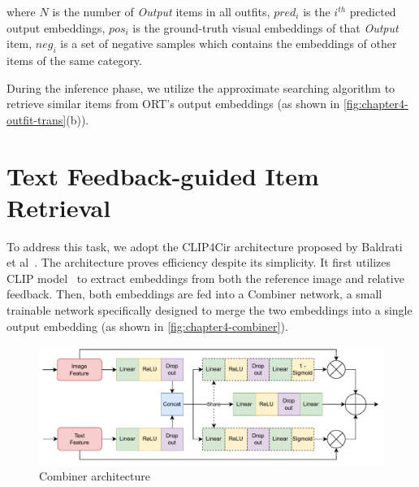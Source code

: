where $N$ is the number of \textit{Output} items in all outfits, $pred_i$ is the $i^{th}$ predicted output embeddings, $pos_i$ is the ground-truth visual embeddings of that \textit{Output} item, $neg_i$ is a set of negative samples which contains the embeddings of other items of the same category. 

During the inference phase, we utilize the approximate searching algorithm to retrieve similar items from ORT's output embeddings (as shown in \autoref{fig:chapter4-outfit-trans}(b)).

\section{Text Feedback-guided Item Retrieval}
To address this task, we adopt the CLIP4Cir architecture proposed by Baldrati et al~\cite{Baldrati-CVPR2022-Conditioned}. The architecture proves efficiency despite its simplicity. It first utilizes CLIP model~\cite{Radford-OpenAIblog2019-Language} to extract embeddings from both the reference image and relative feedback. Then, both embeddings are fed into a Combiner network, a small trainable network specifically designed to merge the two embeddings into a single output embedding (as shown in \autoref{fig:chapter4-combiner}).

\begin{figure}[t!]
    \centering
    \includegraphics[width=\linewidth]{content/resources/images/fashion-recommendation/chapter4-combiner.pdf}
    \caption{Combiner architecture}
    \label{fig:chapter4-combiner}
\end{figure}


